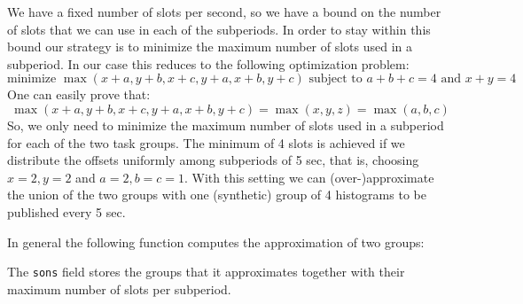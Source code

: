 We have a fixed number of slots per second, so we have a bound on the number of slots that we can use in each of the subperiods. In order to stay within this bound our strategy is to minimize the maximum number of slots used in a subperiod. In our case this reduces to the following optimization problem:
$$ \text{minimize } \max(x+a, y+b, x+c, y+a, x+b, y+c) \text{ subject to } a+b+c=4 \text{ and } x+y = 4 $$
One can easily prove that:
$$ \max(x+a, y+b, x+c, y+a, x+b, y+c) = \max(x, y, z) = \max(a, b, c)$$
So, we only need to minimize the maximum number of slots used in a subperiod for each of the two task groups. The minimum of 4 slots is achieved if we distribute the offsets uniformly among subperiods of 5 sec, that is, choosing $x=2, y=2$ and $a=2, b=c=1$. With this setting we can (over-)approximate the union of the two groups with one (synthetic) group of 4 histograms to be published every 5 sec.

In general the following function computes the approximation of two groups:

The \verb+sons+ field stores the groups that it approximates together with their maximum number of slots per subperiod.

